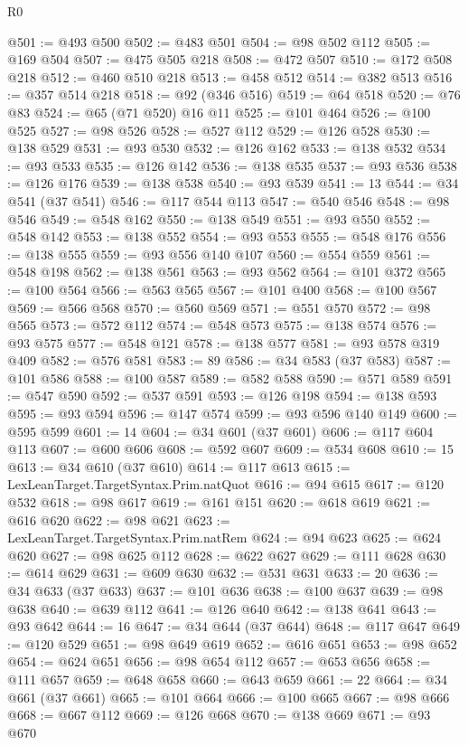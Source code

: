 \begin{lexlean}{R0}
\begin{coremodule}
@501 := @493 @500
@502 := @483 @501
@504 := @98 @502 @112
@505 := @169 @504
@507 := @475 @505 @218
@508 := @472 @507
@510 := @172 @508 @218
@512 := @460 @510 @218
@513 := @458 @512
@514 := @382 @513
@516 := @357 @514 @218
@518 := @92 (@346 @516)
@519 := @64 @518
@520 := @76 @83
@524 := @65 (@71 @520) @16 @11
@525 := @101 @464
@526 := @100 @525
@527 := @98 @526
@528 := @527 @112
@529 := @126 @528
@530 := @138 @529
@531 := @93 @530
@532 := @126 @162
@533 := @138 @532
@534 := @93 @533
@535 := @126 @142
@536 := @138 @535
@537 := @93 @536
@538 := @126 @176
@539 := @138 @538
@540 := @93 @539
@541 := 13
@544 := @34 @541 (@37 @541)
@546 := @117 @544 @113
@547 := @540 @546
@548 := @98 @546
@549 := @548 @162
@550 := @138 @549
@551 := @93 @550
@552 := @548 @142
@553 := @138 @552
@554 := @93 @553
@555 := @548 @176
@556 := @138 @555
@559 := @93 @556 @140 @107
@560 := @554 @559
@561 := @548 @198
@562 := @138 @561
@563 := @93 @562
@564 := @101 @372
@565 := @100 @564
@566 := @563 @565
@567 := @101 @400
@568 := @100 @567
@569 := @566 @568
@570 := @560 @569
@571 := @551 @570
@572 := @98 @565
@573 := @572 @112
@574 := @548 @573
@575 := @138 @574
@576 := @93 @575
@577 := @548 @121
@578 := @138 @577
@581 := @93 @578 @319 @409
@582 := @576 @581
@583 := 89
@586 := @34 @583 (@37 @583)
@587 := @101 @586
@588 := @100 @587
@589 := @582 @588
@590 := @571 @589
@591 := @547 @590
@592 := @537 @591
@593 := @126 @198
@594 := @138 @593
@595 := @93 @594
@596 := @147 @574
@599 := @93 @596 @140 @149
@600 := @595 @599
@601 := 14
@604 := @34 @601 (@37 @601)
@606 := @117 @604 @113
@607 := @600 @606
@608 := @592 @607
@609 := @534 @608
@610 := 15
@613 := @34 @610 (@37 @610)
@614 := @117 @613
@615 := LexLeanTarget.TargetSyntax.Prim.natQuot
@616 := @94 @615
@617 := @120 @532
@618 := @98 @617
@619 := @161 @151
@620 := @618 @619
@621 := @616 @620
@622 := @98 @621
@623 := LexLeanTarget.TargetSyntax.Prim.natRem
@624 := @94 @623
@625 := @624 @620
@627 := @98 @625 @112
@628 := @622 @627
@629 := @111 @628
@630 := @614 @629
@631 := @609 @630
@632 := @531 @631
@633 := 20
@636 := @34 @633 (@37 @633)
@637 := @101 @636
@638 := @100 @637
@639 := @98 @638
@640 := @639 @112
@641 := @126 @640
@642 := @138 @641
@643 := @93 @642
@644 := 16
@647 := @34 @644 (@37 @644)
@648 := @117 @647
@649 := @120 @529
@651 := @98 @649 @619
@652 := @616 @651
@653 := @98 @652
@654 := @624 @651
@656 := @98 @654 @112
@657 := @653 @656
@658 := @111 @657
@659 := @648 @658
@660 := @643 @659
@661 := 22
@664 := @34 @661 (@37 @661)
@665 := @101 @664
@666 := @100 @665
@667 := @98 @666
@668 := @667 @112
@669 := @126 @668
@670 := @138 @669
@671 := @93 @670

\end{coremodule}
\end{lexlean}
